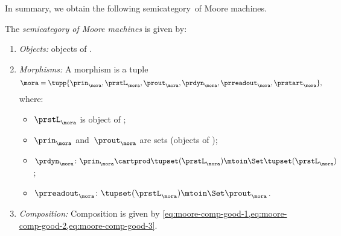     In summary, we obtain the following semicategory~\Moore of Moore machines.
    \begin{definition}[\Moore]
        \label{def:Moore}
        The \emph{semicategory of Moore machines} \Moore is given by:
        \begin{enumerate}
            \item \emph{Objects:} objects of \Set.
            \item \emph{Morphisms:}
                  A morphism is a tuple
                  \begin{equation}
                      \mora = \tupp{\prin_{\mora},\prstL_{\mora},\prout_{\mora},\prdyn_{\mora},\prreadout_{\mora},\prstart_{\mora}},
                  \end{equation}
                  where:
                  \begin{itemize}
                      \item $\prstL_{\mora}$ is object of \SetL;
                      \item $\prin_{\mora}$ and~$\prout_{\mora}$ are sets (objects of \Set);
                      \item $ \prdyn_{\mora} \colon \prin_{\mora}\cartprod \tupset(\prstL_\mora) \mtoin\Set  \tupset(\prstL_\mora)$;
                      \item $ \prreadout_{\mora} \colon \tupset(\prstL_{\mora})  \mtoin\Set \prout_{\mora}$.
                  \end{itemize}
            \item \emph{Composition:}
                  Composition is given by \cref{eq:moore-comp-good-1,eq:moore-comp-good-2,eq:moore-comp-good-3}.
        \end{enumerate}
    \end{definition}


